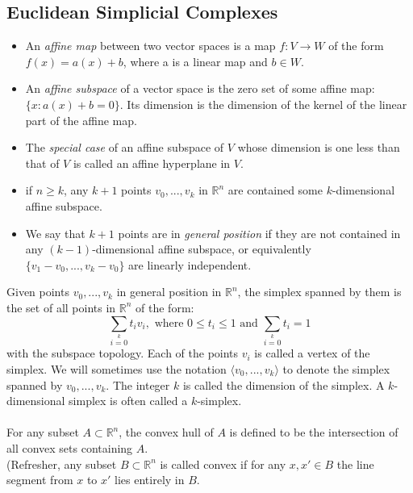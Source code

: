 \documentclass{article}
\begin{document}
  \subsection{Euclidean Simplicial Complexes}
  \begin{itemize}
      \item  An \textit{affine map} between two vector spaces is a map $f:V\to W$ of the form $f(x)=a(x)+b$, where a is a linear map and $b\in W$.
      \item An \textit{affine subspace} of a vector space is the zero set of some affine map: $\{x:a(x)+b=0\}$. Its dimension is the dimension of the kernel of the linear part of the affine map.
      \item The \textit{special case} of an affine subspace of $V$ whose dimension is one less than that of $V$ is called an affine hyperplane in $V$.
      \item if $n\geq k$, any $k+1$ points $v_0,...,v_k$ in $\mathbb{R}^n$ are contained some $k$-dimensional affine subspace.
      \item We say that $k+1$ points are in \textit{general position} if they are not contained in any $(k-1)$-dimensional affine subspace, or equivalently $\{v_1-v_0,...,v_k-v_0\}$ are linearly independent.
  \end{itemize}
  Given points $v_0,...,v_k$ in general position in $\mathbb{R}^n$, the simplex spanned by them is the set of all points in $\mathbb{R}^n$ of the form:
  \begin{equation*}
      \sum\limits_{i=0}\limits^{k}t_iv_i, \text{ where }0\leq t_i \leq 1 \text{ and }\sum\limits_{i=0}\limits^{k}t_i=1
  \end{equation*}
  with the subspace topology. Each of the points $v_i$ is called a vertex of the simplex. We will sometimes use the notation $\langle v_0,...,v_k\rangle$ to denote the simplex spanned by $v_0,...,v_k$. The integer $k$ is called the dimension of the simplex. A $k$-dimensional simplex is often called a $k$-simplex.\\
  \\
  For any subset $A\subset \mathbb{R}^n$, the convex hull of $A$ is defined to be the intersection of all convex sets containing $A$.\\
  (Refresher, any subset $B\subset \mathbb{R}^n$ is called convex if for any $x,x'\in B$ the line segment from $x$ to $x'$ lies entirely in $B$.
  
  
 
\end{document}
